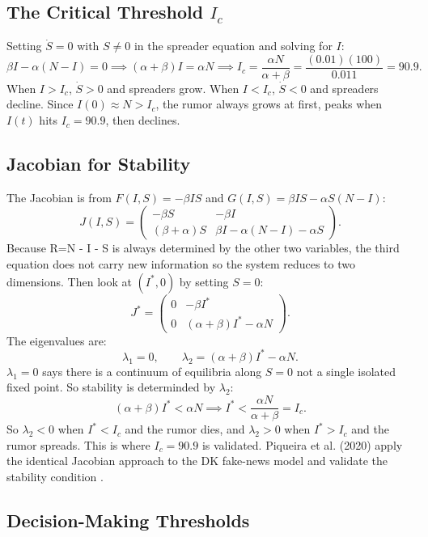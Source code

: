 \documentclass[12pt]{article}
\begin{document}
\subsection{The Critical Threshold $I_c$}

Setting $\dot{S} = 0$ with $S \neq 0$ in the spreader equation and solving
for $I$:
$$\beta I - \alpha(N - I) = 0 \implies (\alpha + \beta)I = \alpha N \implies
I_c = \frac{\alpha N}{\alpha + \beta} = \frac{(0.01)(100)}{0.011} = 90.9.$$
When $I > I_c$, $\dot{S} > 0$ and spreaders grow. When $I < I_c$, $\dot{S}
< 0$ and spreaders decline. Since $I(0) \approx N > I_c$, the rumor always
grows at first, peaks when $I(t)$ hits $I_c = 90.9$, then declines.

\subsection{Jacobian for Stability}

The Jacobian is from $F(I,S) = -\beta IS$ and
$G(I,S) = \beta IS - \alpha S(N-I)$:
$$J(I, S) =
\begin{pmatrix}
-\beta S & -\beta I \\
(\beta + \alpha)S & \beta I - \alpha(N-I) - \alpha S
\end{pmatrix}.$$
Because R=N - I - S is always determined by the other two variables, the third equation does not carry new information so the system reduces to two dimensions.
Then look at $(I^*, 0)$ by setting $S = 0$:
$$J^* =
\begin{pmatrix}
0 & -\beta I^* \\
0 & (\alpha + \beta)I^* - \alpha N
\end{pmatrix}.$$
The eigenvalues are:
$$\lambda_1 = 0, \qquad \lambda_2 = (\alpha + \beta)I^* - \alpha N.$$
$\lambda_1 = 0$ says there is a continuum of equilibria along
$S = 0$ not a single isolated fixed point. So stability is determinded by $\lambda_2$:
$$(\alpha + \beta)I^* < \alpha N \implies I^* < \frac{\alpha N}{\alpha +
\beta} = I_c.$$
So $\lambda_2 < 0$ when $I^* < I_c$ and the rumor dies, and $\lambda_2 > 0$
when $I^* > I_c$ and the rumor spreads. This is where $I_c = 90.9$ is validated. Piqueira et al. (2020) apply the identical Jacobian
approach to the DK fake-news model and validate the stability condition
\cite{piqueira2020}.

\subsection{Decision-Making Thresholds}
\end{document}
